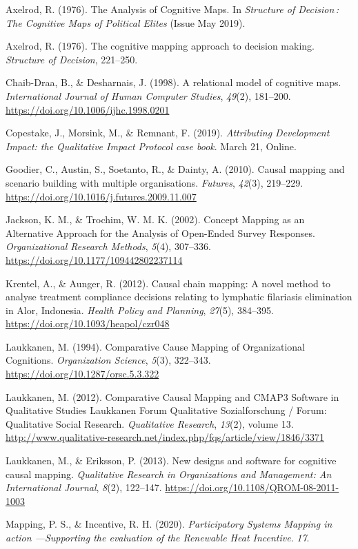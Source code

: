 \documentclass[
]{book}
\begin{document}
Axelrod, R. (1976). The Analysis of Cognitive Maps. In \emph{Structure of Decision\,: The Cognitive Maps of Political Elites} (Issue May 2019).

Axelrod, R. (1976). The cognitive mapping approach to decision making. \emph{Structure of Decision}, 221--250.

Chaib-Draa, B., \& Desharnais, J. (1998). A relational model of cognitive maps. \emph{International Journal of Human Computer Studies}, \emph{49}(2), 181--200. \url{https://doi.org/10.1006/ijhc.1998.0201}

Copestake, J., Morsink, M., \& Remnant, F. (2019). \emph{Attributing Development Impact: the Qualitative Impact Protocol case book}. March 21, Online.

Goodier, C., Austin, S., Soetanto, R., \& Dainty, A. (2010). Causal mapping and scenario building with multiple organisations. \emph{Futures}, \emph{42}(3), 219--229. \url{https://doi.org/10.1016/j.futures.2009.11.007}

Jackson, K. M., \& Trochim, W. M. K. (2002). Concept Mapping as an Alternative Approach for the Analysis of Open-Ended Survey Responses. \emph{Organizational Research Methods}, \emph{5}(4), 307--336. \url{https://doi.org/10.1177/109442802237114}

Krentel, A., \& Aunger, R. (2012). Causal chain mapping: A novel method to analyse treatment compliance decisions relating to lymphatic filariasis elimination in Alor, Indonesia. \emph{Health Policy and Planning}, \emph{27}(5), 384--395. \url{https://doi.org/10.1093/heapol/czr048}

Laukkanen, M. (1994). Comparative Cause Mapping of Organizational Cognitions. \emph{Organization Science}, \emph{5}(3), 322--343. \url{https://doi.org/10.1287/orsc.5.3.322}

Laukkanen, M. (2012). Comparative Causal Mapping and CMAP3 Software in Qualitative Studies \textbar{} Laukkanen \textbar{} Forum Qualitative Sozialforschung / Forum: Qualitative Social Research. \emph{Qualitative Research}, \emph{13}(2), volume 13. \url{http://www.qualitative-research.net/index.php/fqs/article/view/1846/3371}

Laukkanen, M., \& Eriksson, P. (2013). New designs and software for cognitive causal mapping. \emph{Qualitative Research in Organizations and Management: An International Journal}, \emph{8}(2), 122--147. \url{https://doi.org/10.1108/QROM-08-2011-1003}

Mapping, P. S., \& Incentive, R. H. (2020). \emph{Participatory Systems Mapping in action ---Supporting the evaluation of the Renewable Heat Incentive}. \emph{17}.
\end{document}
